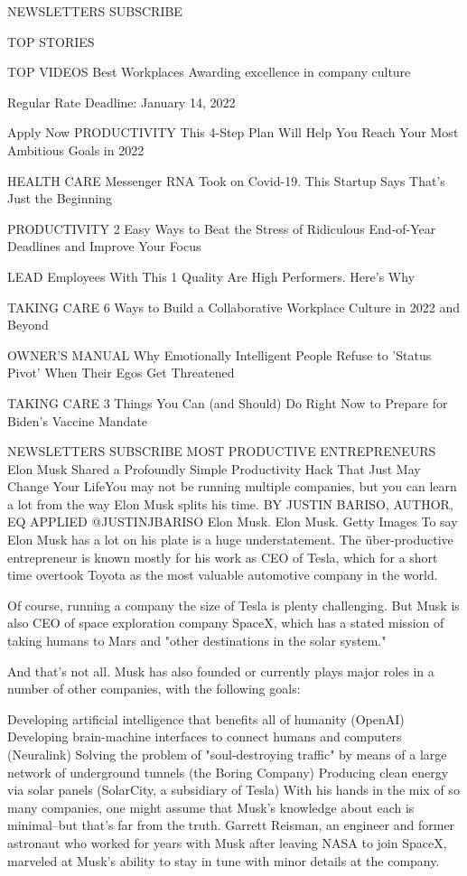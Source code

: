 
NEWSLETTERS
SUBSCRIBE

TOP STORIES

TOP VIDEOS
Best Workplaces
Awarding excellence in company culture

Regular Rate Deadline: January 14, 2022

Apply Now
PRODUCTIVITY
This 4-Step Plan Will Help You Reach Your Most Ambitious Goals in 2022

HEALTH CARE
Messenger RNA Took on Covid-19. This Startup Says That's Just the Beginning

PRODUCTIVITY
2 Easy Ways to Beat the Stress of Ridiculous End-of-Year Deadlines and Improve Your Focus

LEAD
Employees With This 1 Quality Are High Performers. Here's Why

TAKING CARE
6 Ways to Build a Collaborative Workplace Culture in 2022 and Beyond

OWNER'S MANUAL
Why Emotionally Intelligent People Refuse to 'Status Pivot' When Their Egos Get Threatened

TAKING CARE
3 Things You Can (and Should) Do Right Now to Prepare for Biden's Vaccine Mandate

NEWSLETTERS
SUBSCRIBE
MOST PRODUCTIVE ENTREPRENEURS
Elon Musk Shared a Profoundly Simple Productivity Hack That Just May Change Your LifeYou may not be running multiple companies, but you can learn a lot from the way Elon Musk splits his time.
BY JUSTIN BARISO, AUTHOR, EQ APPLIED
@JUSTINJBARISO
Elon Musk.
Elon Musk.
 Getty Images
To say Elon Musk has a lot on his plate is a huge understatement. The über-productive entrepreneur is known mostly for his work as CEO of Tesla, which for a short time overtook Toyota as the most valuable automotive company in the world.

Of course, running a company the size of Tesla is plenty challenging. But Musk is also CEO of space exploration company SpaceX, which has a stated mission of taking humans to Mars and "other destinations in the solar system."

And that's not all. Musk has also founded or currently plays major roles in a number of other companies, with the following goals:

Developing artificial intelligence that benefits all of humanity (OpenAI)
Developing brain-machine interfaces to connect humans and computers (Neuralink)
Solving the problem of "soul-destroying traffic" by means of a large network of underground tunnels (the Boring Company)
Producing clean energy via solar panels (SolarCity, a subsidiary of Tesla)
With his hands in the mix of so many companies, one might assume that Musk's knowledge about each is minimal--but that's far from the truth. Garrett Reisman, an engineer and former astronaut who worked for years with Musk after leaving NASA to join SpaceX, marveled at Musk's ability to stay in tune with minor details at the company.

